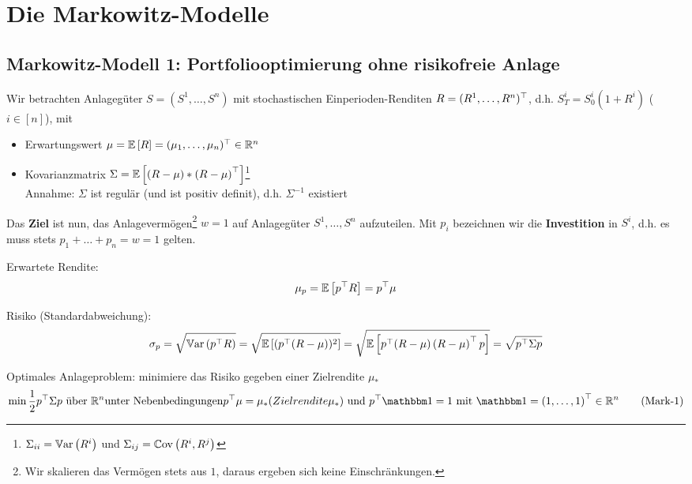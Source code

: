 \section{Die Markowitz-Modelle}

\subsection{Markowitz-Modell 1: Portfoliooptimierung ohne risikofreie Anlage}

Wir betrachten Anlagegüter $S = (S^1, \dots, S^n)$ mit stochastischen Einperioden-Renditen $R=\trans{(R^1, \dots, R^n)}$, d.h. $S_T^i = S_0^i (1+R^i)$ ($i \in [n]$), mit
\begin{itemize}
	\item Erwartungswert $\mu = \EW[R] = \trans{(\mu_1, \dots, \mu_n)} \in \Rn$
	\item Kovarianzmatrix $\Sigma = \EW[(R - \mu) * \transpose{R - \mu}]$\footnote{$\Sigma_{ii} = \Var[R^i]$ und $\Sigma_{ij} = \Cov{R^i}{R^j}$} \\
	Annahme: $\Sigma$ ist regulär (und ist positiv definit), d.h. $\Sigma^{-1}$ existiert
\end{itemize}

Das \textbf{Ziel} ist nun, das Anlagevermögen\footnote{Wir skalieren das Vermögen stets aus $1$, daraus ergeben sich keine Einschränkungen.} $w=1$ auf Anlagegüter $S^1, \dots, S^n$ aufzuteilen. 
Mit $p_i$ bezeichnen wir die \textbf{Investition} in $S^i$, d.h. es muss stets $p_1 + \dots + p_n = w = 1$ gelten.

Erwartete Rendite:
\begin{equation*}
	\mu_p = \EW[\trans{p} R] = \trans{p} \mu
\end{equation*}

Risiko (Standardabweichung): 
\begin{equation*}
	\sigma_p = \sqrt{\Var[\trans{p}R]} = \sqrt{\EW[(\trans{p} (R-\mu))^2]} = \sqrt{\EW[\trans{p}(R-\mu)\transpose{R-\mu} p]} = \sqrt{\trans{p} \Sigma p}
\end{equation*}

Optimales Anlageproblem:
minimiere das Risiko gegeben einer Zielrendite $\mu_\ast$
\begin{equation*}
	\min \frac{1}{2} \trans{p} \Sigma p \text{ über } \Rn 
	\text{unter Nebenbedingungen} \trans{p} \mu = \mu_\ast (Zielrendite \mu_\ast) \und \trans{p} \one = 1 \mit \one = \transpose{1, \dots, 1} \in \Rn
	\tag{Mark-1} \label{eq: mark-1}
\end{equation*}

